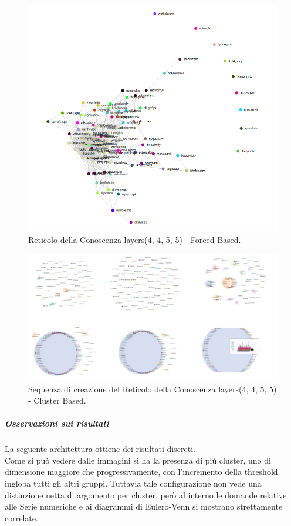 \begin{figure}[H]
\centering
	\includegraphics[width=0.70\linewidth]{./image/logica(4,4,5,5)_forced.png}
	\caption{Reticolo della Conoscenza layers(4, 4, 5, 5) - Forced Based.}
	\label{Reticolo della Conoscenza layers(4, 4, 5, 5) - Forced Based.}
\end{figure}
\noindent
\begin{figure}[H]
\centering
	\includegraphics[width=0.70\linewidth]{./image/collage_reticolo-logica(4,4,5,5).png}
	\caption{Sequenza di creazione del Reticolo della Conoscenza layers(4, 4, 5, 5) - Cluster Based.}
	\label{Sequenza di creazione del Reticolo della Conoscenza layers(4, 4, 5, 5) - Cluster Based.}
\end{figure}
\noindent
\subparagraph{Osservazioni sui risultati}\mbox{}
\noindent
La seguente architettura ottiene dei risultati discreti.\\
Come si può vedere dalle immagini si ha la presenza di più cluster, uno di dimensione maggiore che progressivamente, con l'incremento della threshold. ingloba tutti gli altri gruppi. Tuttavia tale configurazione non vede una distinzione netta di argomento per cluster, però al interno le domande relative alle Serie numeriche e ai diagrammi di Eulero-Venn si mostrano strettamente correlate.
